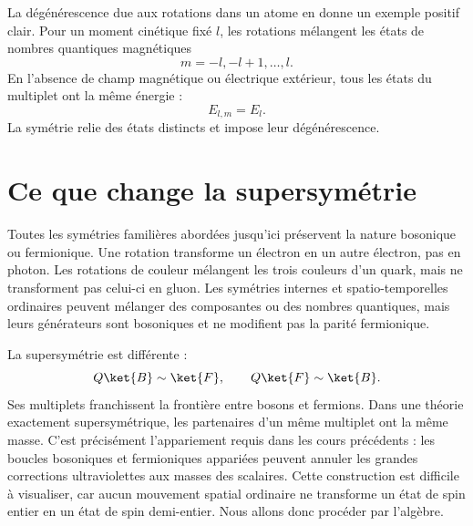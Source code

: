 \begin{classroomqa}
\end{classroomqa}

La dégénérescence due aux rotations dans un atome en donne un exemple positif clair. Pour un moment cinétique fixé \(l\), les rotations mélangent les états de nombres quantiques magnétiques
\begin{equation}
m=-l,-l+1,\ldots,l.
\end{equation}
En l’absence de champ magnétique ou électrique extérieur, tous les états du multiplet ont la même énergie :
\begin{equation}
E_{l,m}=E_l.
\end{equation}
La symétrie relie des états distincts et impose leur dégénérescence.

\section{Ce que change la supersymétrie}

Toutes les symétries familières abordées jusqu’ici préservent la nature bosonique ou fermionique. Une rotation transforme un électron en un autre électron, pas en photon. Les rotations de couleur mélangent les trois couleurs d’un quark, mais ne transforment pas celui-ci en gluon. Les symétries internes et spatio-temporelles ordinaires peuvent mélanger des composantes ou des nombres quantiques, mais leurs générateurs sont bosoniques et ne modifient pas la parité fermionique.

La supersymétrie est différente :
\begin{equation}
Q\ket{B}\sim\ket{F},
\qquad
Q\ket{F}\sim\ket{B}.
\end{equation}
Ses multiplets franchissent la frontière entre bosons et fermions. Dans une théorie exactement supersymétrique, les partenaires d’un même multiplet ont la même masse. C’est précisément l’appariement requis dans les cours précédents : les boucles bosoniques et fermioniques appariées peuvent annuler les grandes corrections ultraviolettes aux masses des scalaires. Cette construction est difficile à visualiser, car aucun mouvement spatial ordinaire ne transforme un état de spin entier en un état de spin demi-entier. Nous allons donc procéder par l’algèbre.

